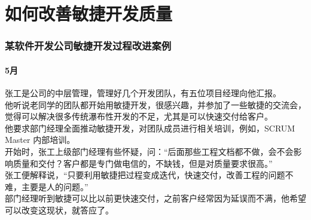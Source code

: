 \chapter{如何改善敏捷开发质量} %



\hypertarget{ux67d0ux8f6fux4ef6ux5f00ux53d1ux516cux53f8ux654fux6377ux5f00ux53d1ux8fc7ux7a0bux6539ux8fdbux6848ux4f8b}{%
\subsection{某软件开发公司敏捷开发过程改进案例}\label{ux67d0ux8f6fux4ef6ux5f00ux53d1ux516cux53f8ux654fux6377ux5f00ux53d1ux8fc7ux7a0bux6539ux8fdbux6848ux4f8b}}

\hypertarget{ux6708}{%
\subsubsection{5月}\label{ux6708}}

张工是公司的中层管理，管理好几个开发团队，有五位项目经理向他汇报。\\
他听说老同学的团队都开始用敏捷开发，很感兴趣，并参加了一些敏捷的交流会，觉得可以解决很多传统瀑布性开发的不足，尤其是可以快速交付给客户。\\
他要求部门经理全面推动敏捷开发，对团队成员进行相关培训，例如，SCRUM Master 内部培训。\\
开始时，张工上级部门经理有些怀疑，问：“后面那些工程文档都不做，会不会影响质量和交付？客户都是专门做电信的，不缺钱，但是对质量要求很高。”\\
张工便解释说，“只要利用敏捷把过程变成迭代，快速交付，改善工程的问题不难，主要是人的问题。”\\
部门经理听到敏捷可以比以前更快速交付，之前客户经常因为延误而不满，他希望可以改变这现状，就答应了。 \\

